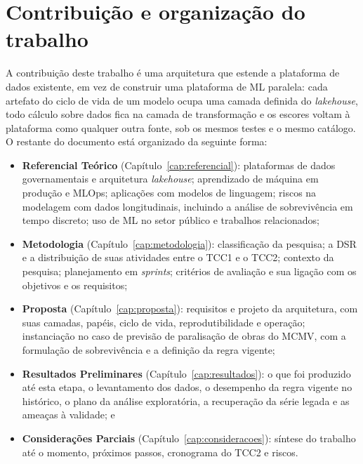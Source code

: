 \section{Contribuição e organização do trabalho}

A contribuição deste trabalho é uma arquitetura que estende a plataforma de dados existente, em vez de construir uma plataforma de ML paralela: cada artefato do ciclo de vida de um modelo ocupa uma camada definida do \textit{lakehouse}, todo cálculo sobre dados fica na camada de transformação e os escores voltam à plataforma como qualquer outra fonte, sob os mesmos testes e o mesmo catálogo. O restante do documento está organizado da seguinte forma:

\begin{itemize}
	\item \textbf{Referencial Teórico} (Capítulo~\ref{cap:referencial}): plataformas de dados governamentais e arquitetura \textit{lakehouse}; aprendizado de máquina em produção e MLOps; aplicações com modelos de linguagem; riscos na modelagem com dados longitudinais, incluindo a análise de sobrevivência em tempo discreto; uso de ML no setor público e trabalhos relacionados;
	\item \textbf{Metodologia} (Capítulo~\ref{cap:metodologia}): classificação da pesquisa; a DSR e a distribuição de suas atividades entre o TCC1 e o TCC2; contexto da pesquisa; planejamento em \textit{sprints}; critérios de avaliação e sua ligação com os objetivos e os requisitos;
	\item \textbf{Proposta} (Capítulo~\ref{cap:proposta}): requisitos e projeto da arquitetura, com suas camadas, papéis, ciclo de vida, reprodutibilidade e operação; instanciação no caso de previsão de paralisação de obras do MCMV, com a formulação de sobrevivência e a definição da regra vigente;
	\item \textbf{Resultados Preliminares} (Capítulo~\ref{cap:resultados}): o que foi produzido até esta etapa, o levantamento dos dados, o desempenho da regra vigente no histórico, o plano da análise exploratória, a recuperação da série legada e as ameaças à validade; e
	\item \textbf{Considerações Parciais} (Capítulo~\ref{cap:consideracoes}): síntese do trabalho até o momento, próximos passos, cronograma do TCC2 e riscos.
\end{itemize}
